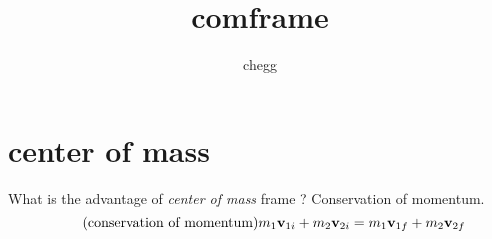 \documentclass[a4paper,12pt]{article}
\title{comframe}
\author{chegg}
\begin{document}
\section*{center of mass}
What is the advantage of \emph{center of mass} frame ?
Conservation of momentum.
\[\tag{conservation of momentum}m_1\vb{v}_{1i}+m_2\vb{v}_{2i}=m_1\vb{v}_{1f}+m_2\vb{v}_{2f}\]
\end{document}
